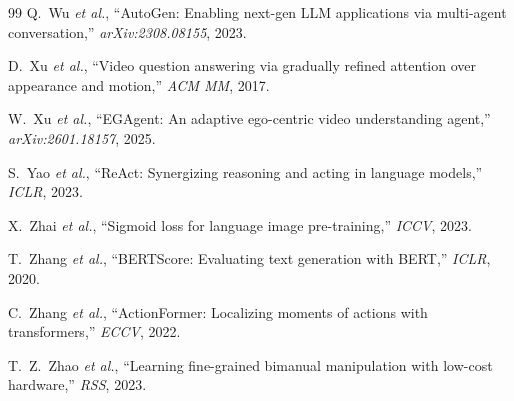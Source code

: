 \documentclass[10pt,twocolumn]{article}
\newcommand{\etal}{\textit{et al.}}
\begin{document}
\begin{thebibliography}{99}
Q.~Wu \etal,
``AutoGen: Enabling next-gen LLM applications via multi-agent
conversation,''
\emph{arXiv:2308.08155}, 2023.

D.~Xu \etal,
``Video question answering via gradually refined attention over
appearance and motion,''
\emph{ACM MM}, 2017.

W.~Xu \etal,
``EGAgent: An adaptive ego-centric video understanding agent,''
\emph{arXiv:2601.18157}, 2025.

S.~Yao \etal,
``ReAct: Synergizing reasoning and acting in language models,''
\emph{ICLR}, 2023.

X.~Zhai \etal,
``Sigmoid loss for language image pre-training,''
\emph{ICCV}, 2023.

T.~Zhang \etal,
``BERTScore: Evaluating text generation with BERT,''
\emph{ICLR}, 2020.

C.~Zhang \etal,
``ActionFormer: Localizing moments of actions with
transformers,''
\emph{ECCV}, 2022.

T.~Z.~Zhao \etal,
``Learning fine-grained bimanual manipulation with
low-cost hardware,''
\emph{RSS}, 2023.

\end{thebibliography}
\end{document}
